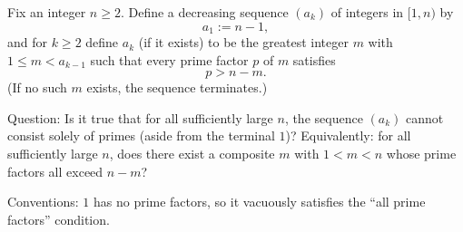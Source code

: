 Fix an integer $n\ge 2$. Define a decreasing sequence $(a_k)$ of integers in $[1,n)$ by
\[
 a_1:=n-1,
\]
and for $k\ge 2$ define $a_k$ (if it exists) to be the greatest integer $m$ with $1\le m<a_{k-1}$ such that every prime factor $p$ of $m$ satisfies
\[
 p>n-m.
\]
(If no such $m$ exists, the sequence terminates.)

Question: Is it true that for all sufficiently large $n$, the sequence $(a_k)$ cannot consist solely of primes (aside from the terminal $1$)?
Equivalently: for all sufficiently large $n$, does there exist a composite $m$ with $1<m<n$ whose prime factors all exceed $n-m$?

Conventions: $1$ has no prime factors, so it vacuously satisfies the “all prime factors” condition.
